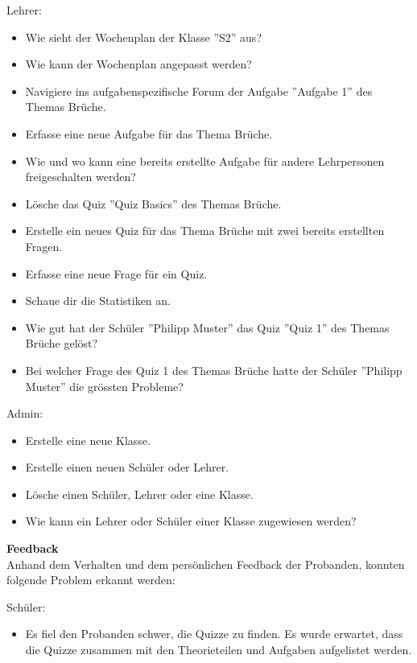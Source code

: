 Lehrer: \\
\begin{itemize}
	\item Wie sieht der Wochenplan der Klasse ''S2'' aus?
	\item Wie kann der Wochenplan angepasst werden?
	\item Navigiere ins aufgabenspezifische Forum der Aufgabe ''Aufgabe 1'' des Themas Brüche.
	\item Erfasse eine neue Aufgabe für das Thema Brüche.
	\item Wie und wo kann eine bereits erstellte Aufgabe für andere Lehrpersonen freigeschalten werden?
	\item Lösche das Quiz ''Quiz Basics'' des Themas Brüche.
	\item Erstelle ein neues Quiz für das Thema Brüche mit zwei bereits erstellten Fragen.
	\item Erfasse eine neue Frage für ein Quiz.
	\item Schaue dir die Statistiken an.
	\item Wie gut hat der Schüler ''Philipp Muster'' das Quiz ''Quiz 1'' des Themas Brüche gelöst?
	\item Bei welcher Frage des Quiz 1 des Themas Brüche hatte der Schüler ''Philipp Muster'' die grössten Probleme?
\end{itemize}


Admin: \\
\begin{itemize}
	\item Erstelle eine neue Klasse.
	\item Erstelle einen neuen Schüler oder Lehrer.
	\item Lösche einen Schüler, Lehrer oder eine Klasse.
	\item Wie kann ein Lehrer oder Schüler einer Klasse zugewiesen werden?
\end{itemize} 

\textbf{Feedback} \\
Anhand dem Verhalten und dem persönlichen Feedback der Probanden, konnten folgende Problem erkannt werden:

Schüler: \\
\begin{itemize}
	\item Es fiel den Probanden schwer, die Quizze zu finden. Es wurde erwartet, dass die Quizze zusammen mit den Theorieteilen und Aufgaben aufgelistet werden.
\end{itemize}

